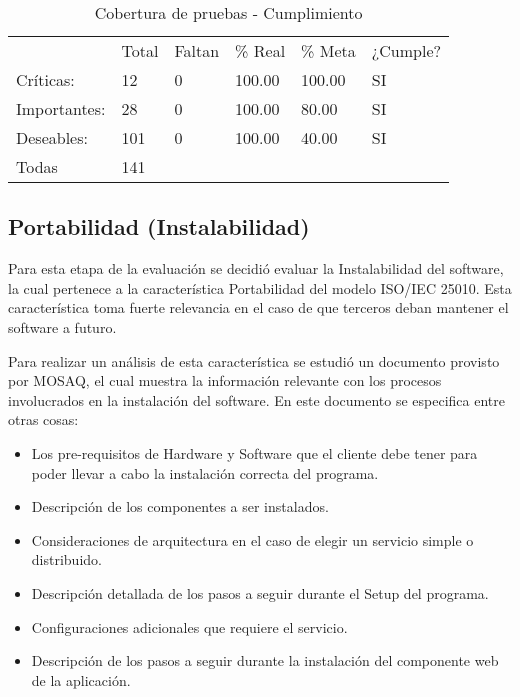 \begin{table}[hb]
\centering
    \begin{tabular}{llllll}
    ~               &  		Total &  		Faltan &  		\% Real &  		\% Meta & ¿Cumple? \\
     		Críticas:    &  		12    & 0         &  		100.00 &  		100.00 &  		SI    \\
     		Importantes: &  		28    & 0         &  		100.00 &  		80.00  &  		SI    \\
     		Deseables:   &  		101   & 0         &  		100.00 &  		40.00  &  		SI    \\
     		Todas        &  		141   & ~         & ~         & ~         & ~        \\ \hline
    \end{tabular}
         \caption{Cobertura de pruebas - Cumplimiento}
    \label{table:CBC}
\end{table}

\subsection{Portabilidad (Instalabilidad)}
\label{ins}
Para esta etapa de la evaluación se decidió evaluar la Instalabilidad del software, la cual pertenece
a la característica Portabilidad del modelo ISO/IEC 25010. Esta característica toma fuerte relevancia
en el caso de que terceros deban mantener el software a futuro.

Para realizar un análisis de esta característica se estudió un documento provisto por MOSAQ, el cual
muestra la información relevante con los procesos involucrados en la instalación del software.
En este documento se especifica entre otras cosas:

\begin{itemize}
\item Los pre-requisitos de Hardware y Software que el cliente debe tener para poder llevar a cabo la instalación correcta del programa.
\item Descripción de los componentes a ser instalados.
\item Consideraciones de arquitectura en el caso de elegir un servicio simple o distribuido.
\item Descripción detallada de los pasos a seguir durante el Setup del programa.
\item Configuraciones adicionales que requiere el servicio.
\item Descripción de los pasos a seguir durante la instalación del componente web de la aplicación.
\end{itemize}

